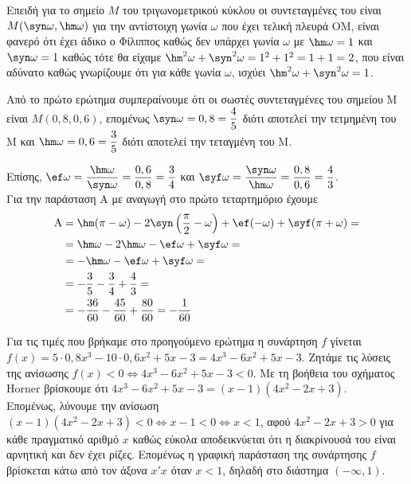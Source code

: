 \begin{alist}
\item Επειδή για το σημείο $M$ του τριγωνομετρικού κύκλου οι συντεταγμένες του είναι $M(\syn \omega, \hm \omega)$ για την αντίστοιχη γωνία $\omega$ που έχει τελική πλευρά OM, είναι φανερό ότι έχει άδικο ο Φίλιππος καθώς δεν υπάρχει γωνία $\omega$ με $\hm \omega = 1$ και $\syn \omega = 1$ καθώς τότε θα είχαμε $\hm ^2\omega + \syn ^2\omega = 1^2 + 1^2 = 1+1 = 2$, που είναι αδύνατο καθώς γνωρίζουμε ότι για κάθε γωνία $\omega$, ισχύει $\hm ^2\omega + \syn ^2\omega = 1$.
\item 
\begin{rlist}
\item Από το πρώτο ερώτημα συμπεραίνουμε ότι οι σωστές συντεταγμένες του σημείου M είναι $M(0,8, 0,6)$, επομένως $\syn \omega = 0,8 = \dfrac{4}{5}$ διότι αποτελεί την τετμημένη του M και $\hm \omega = 0,6 = \dfrac{3}{5}$ διότι αποτελεί την τεταγμένη του M.
\item Επίσης, $\ef \omega = \dfrac{\hm \omega}{\syn \omega} = \dfrac{0,6}{0,8} = \dfrac{3}{4}$ και $\syf \omega = \dfrac{\syn \omega}{\hm \omega} = \dfrac{0,8}{0,6} = \dfrac{4}{3}$. \\
Για την παράσταση A με αναγωγή στο πρώτο τεταρτημόριο έχουμε
\begin{align*}
\text{A} &= \hm (\pi-\omega) - 2\syn \left(\frac{\pi}{2}-\omega\right) + \ef (-\omega) + \syf (\pi+\omega) = \\
&= \hm \omega - 2\hm \omega - \ef \omega + \syf \omega = \\
&= -\hm \omega - \ef \omega + \syf \omega = \\
&= -\frac{3}{5} - \frac{3}{4} + \frac{4}{3} = \\
&= -\frac{36}{60} - \frac{45}{60} + \frac{80}{60} = -\frac{1}{60}
\end{align*}
\end{rlist}
\item Για τις τιμές που βρήκαμε στο προηγούμενο ερώτημα η συνάρτηση $f$ γίνεται $f(x) = 5\cdot 0,8x^3 - 10\cdot 0,6x^2 + 5x - 3 = 4x^3 - 6x^2 + 5x - 3$. Ζητάμε τις λύσεις της ανίσωσης $f(x) < 0 \Leftrightarrow 4x^3 - 6x^2 + 5x - 3 < 0$. Με τη βοήθεια του σχήματος Horner βρίσκουμε ότι $4x^3 - 6x^2 + 5x - 3 = (x-1)(4x^2 - 2x + 3)$. \\
Επομένως, λύνουμε την ανίσωση $(x-1)(4x^2 - 2x + 3) < 0 \Leftrightarrow x-1 < 0 \Leftrightarrow x < 1$, αφού $4x^2 - 2x + 3 > 0$ για κάθε πραγματικό αριθμό $x$ καθώς εύκολα αποδεικνύεται ότι η διακρίνουσά του είναι αρνητική και δεν έχει ρίζες. Επομένως η γραφική παράσταση της συνάρτησης $f$ βρίσκεται κάτω από τον άξονα $x'x$ όταν $x<1$, δηλαδή στο διάστημα $(-\infty, 1)$.
\end{alist}

